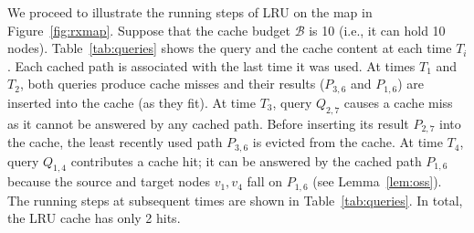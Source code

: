 \documentclass{sig-alternate}
\begin{document}
We proceed to illustrate the running steps of LRU on the map in Figure~\ref{fig:rxmap}.
Suppose that the cache budget $\mathcal{B}$ is 10 (i.e., it can hold 10 nodes).
Table~\ref{tab:queries} shows the query and the cache content at each time $T_i$.
Each cached path is associated with the last time it was used.
%
At times $T_1$ and $T_2$, both queries produce cache misses and
their results ($P_{3,6}$ and $P_{1,6}$) are inserted into the cache (as they fit).
At time $T_3$, query $Q_{2,7}$ causes a cache miss as it cannot be answered by any cached path.
Before inserting its result $P_{2,7}$ into the cache, the least recently used path $P_{3,6}$ is evicted from the cache.
At time $T_4$, query $Q_{1,4}$ contributes a cache hit;
it can be answered by the cached path $P_{1,6}$ because the source and target nodes $v_1, v_4$ fall on $P_{1,6}$ (see Lemma~\ref{lem:oss}).
%
The running steps at subsequent times are shown in Table~\ref{tab:queries}.
In total, the LRU cache has only 2 hits.

\end{document}
